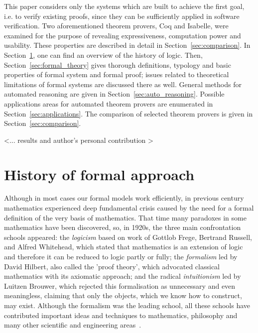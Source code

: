 \documentclass[article]{aaltoseries}
\begin{document}
This paper considers only the systems which are built to achieve the first goal, i.e. to verify existing proofs, since they can be sufficiently applied in software verification. Two aforementioned theorem provers, Coq and Isabelle, were examined for the purpose of revealing expressiveness, computation power and usability. These properties are described in detail in Section~\ref{sec:comparison}.
In Section~\ref{sec:formal_history}, one can find an overview of the history of logic. Then, Section~\ref{sec:formal_theory} gives thorough definitions, typology and basic properties of formal system and formal proof; issues related to theoretical limitations of formal systems are discussed there as well. General methods for automated reasoning are given in Section~\ref{sec:auto_reasoning}. Possible applications areas for automated theorem provers are enumerated in Section~\ref{sec:applications}. The comparison of selected theorem provers is given in Section~\ref{sec:comparison}.

<... results and author's personal contribution >



\section{History of formal approach}
\label{sec:formal_history}

Although in most cases our formal models work efficiently, in previous century mathematics experienced deep fundamental crisis caused by the need for a formal definition of the very basis of mathematics. That time many paradoxes in some mathematics have been discovered, so, in 1920s, the three main confrontation schools appeared:
the \textit{logicism} based on work of Gottlob Frege, Bertrand Russell, and Alfred Whitehead, which stated that mathematics is an extension of logic and therefore it can be reduced to logic partly or fully;
the \textit{formalism} led by David Hilbert, also called the 'proof theory', which advocated classical mathematics with its axiomatic approach;
and the radical \textit{intuitionism} led by Luitzen Brouwer, which rejected this formalisation as unnecessary and even meaningless, claiming that only the objects, which we know how to construct, may exist.
Although the formalism was the leading school, all these schools have contributed important ideas and techniques to mathematics, philosophy and many other scientific and engineering areas~\cite{Fer08}.
\end{document}
